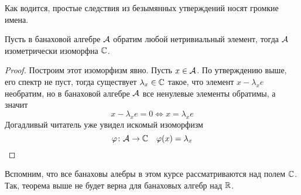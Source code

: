 Как водится, простые следствия из безымянных утверждений носят громкие имена. 
\begin{theorem}\label{th:gelmaz}
	Пусть в банаховой алгебре $\mathcal{A}$ обратим любой нетривиальный элемент, тогда $\mathcal{A}$ изометрически изоморфна $\mathbb{C}$.
\end{theorem}
\begin{proof}
	Построим этот изоморфизм явно. Пусть $x \in \mathcal{A}$. По утверждению выше, его спектр не пуст, тогда существует $\lambda_x \in \mathbb{C}$ такое, что элемент $x - \lambda_x e$ необратим, но в банаховой алгебре $\mathcal{A}$ все ненулевые элементы обратимы, а значит 
	$$
	x - \lambda_x e = 0 \Leftrightarrow x = \lambda_x e
	$$
	Догадливый читатель уже увидел искомый изоморфизм 
	$$\varphi\colon \mathcal{A} \to \mathbb{C} \quad
	\varphi(x) = \lambda_x
	$$
\end{proof}
\begin{remark}
	Вспомним, что все банаховы алебры в этом курсе рассматриваются над полем $\mathbb{C}$. Так, теорема выше не будет верна для банаховых алгебр над $\mathbb{R}$. 
\end{remark}